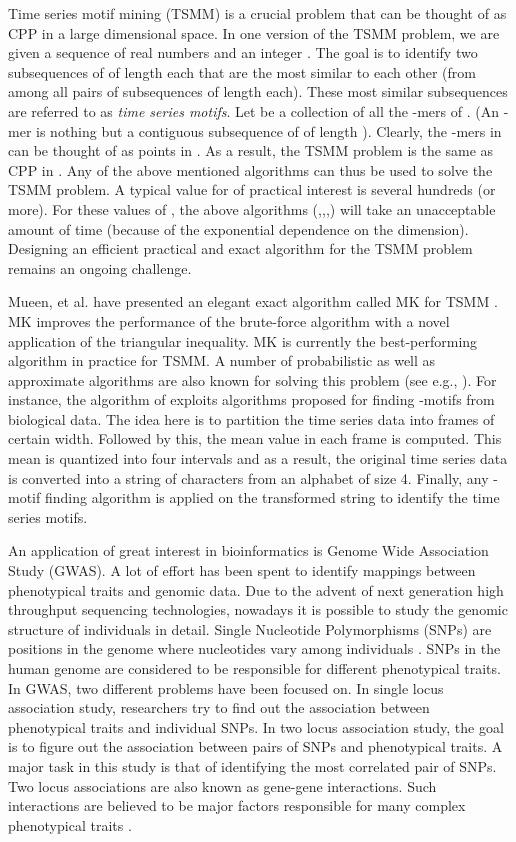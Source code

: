 \documentclass{article}
\theoremstyle{definition}
\theoremstyle{remark}
\begin{document}
Time series motif mining (TSMM) is a crucial problem that can be thought of as CPP in a large dimensional space. In one version of the TSMM problem, we are given a sequence  of real numbers and an integer . The goal is to identify two subsequences of  of length  each that are the most similar to each other (from among all pairs of subsequences of length  each). These most similar subsequences are referred to as {\em time series motifs}. Let  be a collection of all the -mers of . (An -mer is nothing but a contiguous subsequence of  of length ). Clearly, the -mers in  can be thought of as points in . As a result, the TSMM problem is the same as CPP in . Any of the above mentioned algorithms can thus be used to solve the TSMM problem. A typical value for  of practical interest is several hundreds (or more). For these values of , the above algorithms (\cite{RAB76},\cite{FH79},\cite{PS86},\cite{SY95}) will take an unacceptable amount of time (because of the exponential dependence on the dimension). Designing an efficient practical and exact algorithm for the TSMM problem remains an ongoing challenge.

Mueen, et al. have presented an elegant exact algorithm called MK for TSMM \cite{AEQSB09}. MK improves the performance of the brute-force algorithm with a novel application of the triangular inequality. MK is currently the best-performing algorithm in practice for TSMM.
A number of probabilistic as well as approximate algorithms are also known for solving this problem (see e.g., \cite{PMPS08,BES03,TCM07,JJMY08,DCIT07,SG04,YKK05}). For instance, the algorithm of \cite{BES03} exploits algorithms proposed for finding -motifs from biological data. The idea here is to partition the time series data into frames of certain width. Followed by this, the mean value in each frame is computed. This mean is quantized into four intervals and as a result, the original time series data is converted into a string of characters from an alphabet of size 4. Finally, any -motif finding algorithm is applied on the transformed string to identify the time series motifs.

An application of great interest in bioinformatics is Genome Wide Association Study (GWAS). A lot of effort has been spent to identify mappings between phenotypical traits and genomic data. Due to the advent of next generation high throughput sequencing technologies, nowadays it is possible to study the genomic structure of individuals in detail. Single Nucleotide Polymorphisms (SNPs) are  positions in the genome where nucleotides vary among individuals \cite{T07}. SNPs in the human genome are considered to be responsible for different phenotypical traits. In GWAS,  two different problems have been focused on. In single locus association study, researchers try to find out the association between phenotypical traits and individual SNPs. In two locus association study, the goal is to figure out the association between pairs of SNPs and phenotypical traits. A major task in this study is that of identifying the most correlated pair of SNPs. Two locus associations are also known as gene-gene interactions.
Such interactions are believed to be major factors responsible for many complex phenotypical traits \cite{SDNRCNHD07,CDDBDADLMDCJE05,JDLCMPMLYJBEJSTS98,H09,NMDPCGA99,JCSEBSAKLDPJW04}.
\end{document}
